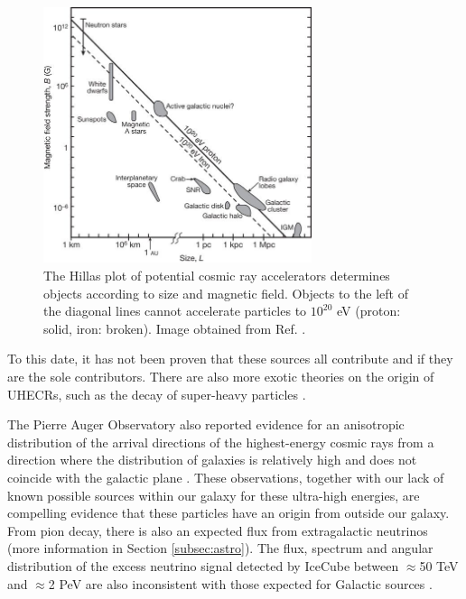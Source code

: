 \begin{figure}
\centering
\includegraphics[width = 0.7\textwidth]{chapter3/img/Hillas.jpg}
\caption{The Hillas plot of potential cosmic ray accelerators determines objects according to size and magnetic field. Objects to the left of the diagonal lines cannot accelerate particles to $10^{20}$ eV (proton: solid, iron: broken). Image obtained from Ref. \cite{Bauleo:2009zz}.}
\label{fig:hillas}
\end{figure}

To this date, it has not been proven that these sources all contribute and if they are the sole contributors. There are also more exotic theories on the origin of UHECRs, such as the decay of super-heavy particles \cite{Nagano:2000ve}.



The Pierre Auger Observatory also reported evidence for an anisotropic distribution of the arrival directions of the highest-energy cosmic rays from a direction where the distribution of galaxies is relatively high and does not coincide with the galactic plane \cite{Aab:2017tyv}. These observations, together with our lack of known possible sources within our galaxy for these ultra-high energies, are compelling evidence that these particles have an origin from outside our galaxy. From pion decay, there is also an expected flux from extragalactic neutrinos (more information in Section \ref{subsec:astro}). The flux, spectrum and angular distribution of the excess neutrino signal detected by IceCube between $\approx$50 TeV and $\approx$2 PeV are also inconsistent with those expected for Galactic sources \cite{Waxman:2013zda}.\\


